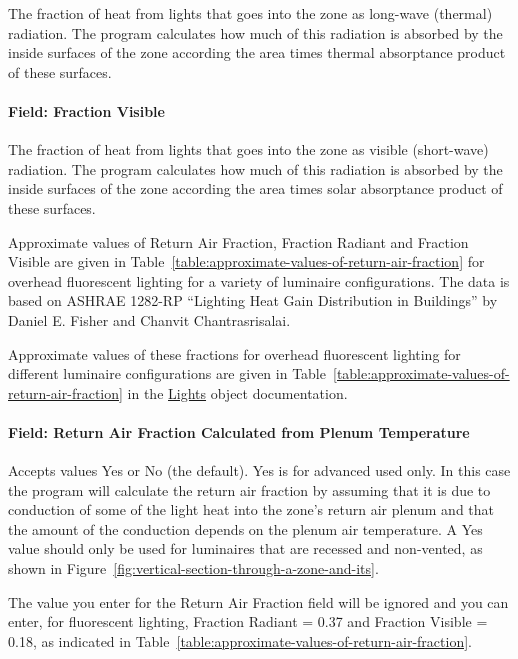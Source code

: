 The fraction of heat from lights that goes into the zone as long-wave (thermal) radiation. The program calculates how much of this radiation is absorbed by the inside surfaces of the zone according the area times thermal absorptance product of these surfaces.

\paragraph{Field: Fraction Visible}\label{field-fraction-visible-lights-definition}

The fraction of heat from lights that goes into the zone as visible (short-wave) radiation. The program calculates how much of this radiation is absorbed by the inside surfaces of the zone according the area times solar absorptance product of these surfaces.

Approximate values of Return Air Fraction, Fraction Radiant and Fraction Visible are given in Table~\ref{table:approximate-values-of-return-air-fraction} for overhead fluorescent lighting for a variety of luminaire configurations. The data is based on ASHRAE 1282-RP ``Lighting Heat Gain Distribution in Buildings'' by Daniel E. Fisher and Chanvit Chantrasrisalai.

Approximate values of these fractions for overhead fluorescent lighting for different luminaire configurations are given in Table~\ref{table:approximate-values-of-return-air-fraction} in the \hyperref[lights-000]{Lights} object documentation.

\paragraph{Field: Return Air Fraction Calculated from Plenum Temperature}\label{field-return-air-fraction-calculated-from-plenum-temperature-lights-definition}

Accepts values Yes or No (the default). Yes is for advanced used only. In this case the program will calculate the return air fraction by assuming that it is due to conduction of some of the light heat into the zone's return air plenum and that the amount of the conduction depends on the plenum air temperature. A Yes value should only be used for luminaires that are recessed and non-vented, as shown in Figure~\ref{fig:vertical-section-through-a-zone-and-its}.

The value you enter for the Return Air Fraction field will be ignored and you can enter, for fluorescent lighting, Fraction Radiant = 0.37 and Fraction Visible = 0.18, as indicated in Table~\ref{table:approximate-values-of-return-air-fraction}.

